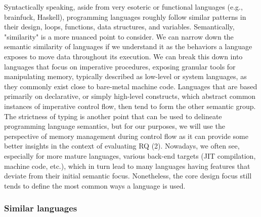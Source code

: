 Syntactically speaking, aside from very esoteric or functional languages (e.g., brainfuck, Haskell), programming languages roughly follow similar patterns in their design, \ie loops, functions, data structures, and variables. Semantically, "similarity" is a more nuanced point to consider. We can narrow down the semantic similarity of languages if we understand it as the behaviors a language exposes to move data throughout its execution. We can break this down into languages that focus on imperative procedures, exposing granular tools for manipulating memory, typically described as low-level or system languages, as they commonly exist close to bare-metal machine code. Languages that are based primarily on declarative, or simply high-level constructs, which abstract common instances of imperative control flow, then tend to form the other semantic group. The strictness of typing is another point that can be used to delineate programming language semantics, but for our purposes, we will use the perspective of memory management during control flow as it can provide some better insights in the context of evaluating RQ (2). Nowadays, we often see, especially for more mature languages, various back-end targets (JIT compilation, machine code, etc.), which in turn lead to many languages having features that deviate from their initial semantic focus. Nonetheless, the core design focus still tends to define the most common ways a language is used. 

\subsubsection{Similar languages}\label{s:similar_langs}

